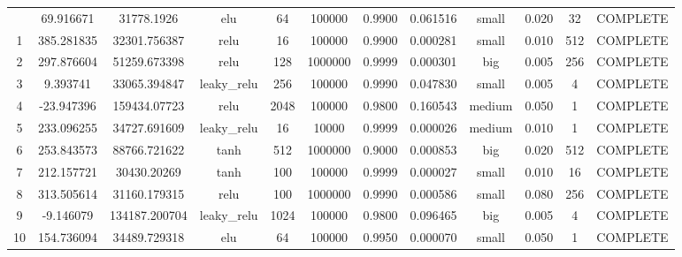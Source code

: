 \begin{longtable}{cccccccccccc}
\bottomrule
\endlastfoot
                        0 &                  69.916671 &                         31778.1926 &             elu &          64 &       100000 & 0.9900 &       0.061516 &     small & 0.020 &          32 & COMPLETE \\
                        1 &                 385.281835 &                       32301.756387 &            relu &          16 &       100000 & 0.9900 &       0.000281 &     small & 0.010 &         512 & COMPLETE \\
                        2 &                 297.876604 &                       51259.673398 &            relu &         128 &      1000000 & 0.9999 &       0.000301 &       big & 0.005 &         256 & COMPLETE \\
                        3 &                   9.393741 &                       33065.394847 &     leaky\_relu &         256 &       100000 & 0.9990 &       0.047830 &     small & 0.005 &           4 & COMPLETE \\
                        4 &                 -23.947396 &                       159434.07723 &            relu &        2048 &       100000 & 0.9800 &       0.160543 &    medium & 0.050 &           1 & COMPLETE \\
                        5 &                 233.096255 &                       34727.691609 &     leaky\_relu &          16 &        10000 & 0.9999 &       0.000026 &    medium & 0.010 &           1 & COMPLETE \\
                        6 &                 253.843573 &                       88766.721622 &            tanh &         512 &      1000000 & 0.9000 &       0.000853 &       big & 0.020 &         512 & COMPLETE \\
                        7 &                 212.157721 &                        30430.20269 &            tanh &         100 &       100000 & 0.9999 &       0.000027 &     small & 0.010 &          16 & COMPLETE \\
                        8 &                 313.505614 &                       31160.179315 &            relu &         100 &      1000000 & 0.9990 &       0.000586 &     small & 0.080 &         256 & COMPLETE \\
                        9 &                  -9.146079 &                      134187.200704 &     leaky\_relu &        1024 &       100000 & 0.9800 &       0.096465 &       big & 0.005 &           4 & COMPLETE \\
                       10 &                 154.736094 &                       34489.729318 &             elu &          64 &       100000 & 0.9950 &       0.000070 &     small & 0.050 &           1 & COMPLETE \\

\end{longtable}
